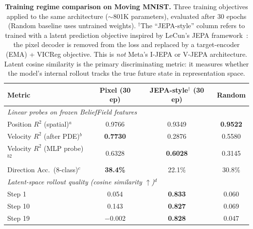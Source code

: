 %

\begin{table}[t]
    \centering
    \caption{\textbf{Training regime comparison on Moving MNIST.} Three training objectives applied to the same \fluidworld{} architecture ($\sim$801K parameters), evaluated after 30 epochs (Random baseline uses untrained weights). $^\dagger$The ``JEPA-style'' column refers to \fluidworld{} trained with a latent prediction objective inspired by LeCun's JEPA framework~\cite{lecun2022path}: the pixel decoder is removed from the loss and replaced by a target-encoder (EMA) + VICReg objective. This is \emph{not} Meta's I-JEPA or V-JEPA architecture. Latent cosine similarity is the primary discriminating metric: it measures whether the model's internal rollout tracks the true future state in representation space.}
    \label{tab:training_regime_comparison}
    \begin{tabular}{lccc}
        \toprule
        \textbf{Metric} & \textbf{Pixel (30 ep)} & \textbf{JEPA-style$^\dagger$ (30 ep)} & \textbf{Random} \\
        \midrule
        \multicolumn{4}{l}{\textit{Linear probes on frozen BeliefField features}} \\
        \quad Position $R^2$ (spatial)$^a$    & 0.9766          & 0.9349          & \textbf{0.9522} \\
        \quad Velocity $R^2$ (after PDE)$^b$  & \textbf{0.7730} & 0.2876          & 0.5580          \\
        \quad Velocity $R^2$ (MLP probe)$^{b2}$ & 0.6328         & \textbf{0.6028} & 0.3145          \\
        \quad Direction Acc.\ (8-class)$^c$   & \textbf{38.4\%} & 22.1\%          & 30.8\%          \\
        \midrule
        \multicolumn{4}{l}{\textit{Latent-space rollout quality (cosine similarity $\uparrow$)}$^d$} \\
        \quad Step 1                          & 0.054           & \textbf{0.833}  & 0.060           \\
        \quad Step 10                         & 0.143           & \textbf{0.827}  & 0.069           \\
        \quad Step 19                         & $-$0.002        & \textbf{0.828}  & 0.047           \\
        \bottomrule
    \end{tabular}


\end{table}
